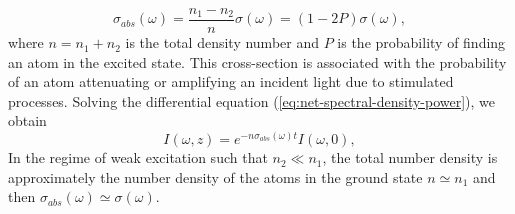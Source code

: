 \begin{equation}
	\sigma_{abs}(\omega) = \frac{n_1 - n_2}{n} \sigma(\omega) = (1 - 2P)\sigma(\omega),
	\label{eq:net-absorption-cross-section}
\end{equation}
where $ n = n_1 + n_2 $ is the total density number and $ P $ is the probability of finding an atom in the excited state. This cross-section is associated with the probability of an atom attenuating or amplifying an incident light due to stimulated processes. Solving the differential equation (\ref{eq:net-spectral-density-power}), we obtain
\begin{equation}
	I(\omega, z) = e^{-n\sigma_{abs}(\omega)t}I(\omega, 0),
	\label{eq:Beer-Lambert-law}
\end{equation}
In the regime of weak excitation such that $ n_2 \ll n_1 $, the total number density is approximately the number density of the atoms in the ground state $ n \simeq n_1 $ and then $ \sigma_{abs}(\omega) \simeq \sigma(\omega) $.

